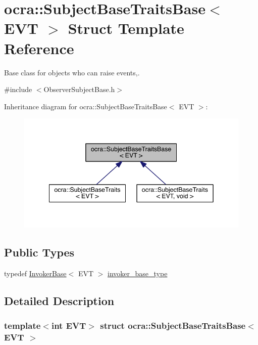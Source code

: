 \hypertarget{structocra_1_1SubjectBaseTraitsBase}{}\section{ocra\+:\+:Subject\+Base\+Traits\+Base$<$ E\+VT $>$ Struct Template Reference}
\label{structocra_1_1SubjectBaseTraitsBase}


Base class for objects who can raise events,.  




{\ttfamily \#include $<$Observer\+Subject\+Base.\+h$>$}



Inheritance diagram for ocra\+:\+:Subject\+Base\+Traits\+Base$<$ E\+VT $>$\+:\nopagebreak
\begin{figure}[H]
\begin{center}
\leavevmode
\includegraphics[width=342pt]{df/dc4/structocra_1_1SubjectBaseTraitsBase__inherit__graph}
\end{center}
\end{figure}
\subsection*{Public Types}
\begin{DoxyCompactItemize}
\item 
typedef \hyperlink{classocra_1_1InvokerBase}{Invoker\+Base}$<$ E\+VT $>$ \hyperlink{structocra_1_1SubjectBaseTraitsBase_a439671662c8f8f3e80e6675f008dec3f}{invoker\+\_\+base\+\_\+type}
\end{DoxyCompactItemize}


\subsection{Detailed Description}
\subsubsection*{template$<$int E\+VT$>$\newline
struct ocra\+::\+Subject\+Base\+Traits\+Base$<$ E\+V\+T $>$}


